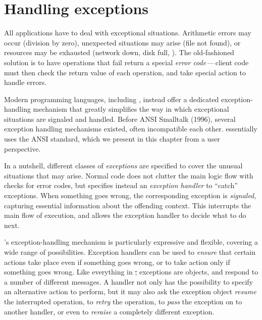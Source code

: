 \documentclass[a4paper,10pt,twoside]{book}
\begin{document}
	\sloppy
\fi

\chapter{Handling exceptions}



All applications have to deal with exceptional situations.
Arithmetic errors may occur (division by zero), unexpected situations may arise (file not found), or resources may be exhausted (network down, disk full, \etc).
The old-fashioned solution is to have operations that fail return a special \emph{error code}\,---\,client code must then check the return value of each operation, and take special action to handle errors.

Modern programming languages, including \squeak, instead offer a dedicated exception-handling mechanism that greatly simplifies the way in which exceptional situations are signaled and handled.
Before ANSI Smalltalk (1996), several  exception handling mechanisms existed, often incompatible each other. \squeak essentially uses the ANSI standard, which we present in this chapter from a user perspective.

In a nutshell, different classes of \emph{exceptions} are specified to cover the unusual situations that may arise.
Normal code does not clutter the main logic flow with checks for error codes, but specifies instead an \emph{exception handler} to ``catch'' exceptions.
When something goes wrong, the corresponding exception is \emph{signaled}, capturing essential information about the offending context.
This interrupts the main flow of execution, and allows the exception handler to decide what to do next.

\squeak's exception-handling mechanism is particularly expressive and flexible, covering a wide range of possibilities. Exception handlers can be used to \emph{ensure} that certain actions take place even if something goes wrong, or to take action only if something goes wrong.
Like everything in \st, exceptions are objects, and respond to a number of different messages.
A handler not only has the possibility to specify an alternative action to perform, but it may also ask the exception object \emph{resume} the interrupted operation, to \emph{retry} the operation, to \emph{pass} the exception on to another handler, or even to \emph{reraise} a completely different exception.
\end{document}
